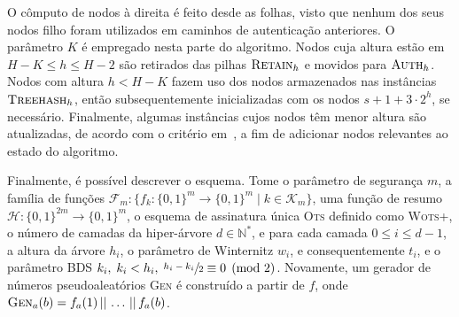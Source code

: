 \documentclass[12pt]{report}
\newcommand{\hh}{\mathcal{H}}
\newcommand{\concat}{\, \vert \vert \,}
\newcommand{\binwds}[1]{\{0, 1\}^{#1}}
\begin{document}
O cômputo de nodos à direita é feito desde as folhas, visto que nenhum dos seus nodos filho foram utilizados em caminhos de autenticação anteriores. O parâmetro $K$ é empregado nesta parte do algoritmo. Nodos cuja altura estão em $H - K \leq h \leq H - 2$ são retirados das pilhas $\textsc{Retain}_{h}$ e movidos para $\textsc{Auth}_h$. Nodos com altura $h < H - K$ fazem uso dos nodos armazenados nas instâncias $\textsc{Treehash}_{h}$, então subsequentemente inicializadas com
os nodos $s + 1 + 3 \cdot 2^h$, se necessário. Finalmente, algumas instâncias cujos nodos têm menor altura são atualizadas, de acordo com o critério em~\cite[4.5]{Bernstein:2008:PQC:1522375}, a fim de adicionar nodos relevantes ao estado do algoritmo.

Finalmente, é possível descrever o esquema. Tome o parâmetro de segurança $m$, a família de funções $\mathcal{F}_m : \{f_k : \binwds{m} \longrightarrow \binwds{m} \mid k \in \mathcal{K}_m\}$, uma função de resumo $\hh{} : \binwds{2m} \longrightarrow \binwds{m}$, o esquema de assinatura única \textsc{Ots} definido como \textsc{Wots+}, o número de camadas da hiper-árvore $d \in \mathbb{N}^{*}$, e para cada camada $0 \leq i \leq d - 1$, a altura da árvore $h_i$, o parâmetro de Winternitz $w_i$, e consequentemente $t_i$, e o parâmetro BDS $k_i, \; k_i < h_i, \; \sfrac{h_i - k_i}{2} \equiv 0 \pmod{2}$. Novamente, um gerador de números pseudoaleatórios \textsc{Gen} é construído a partir de $f$, onde $\textsc{Gen}_{a}(b) = f_a(1) \concat \dots \concat f_a(b)$.
\end{document}
